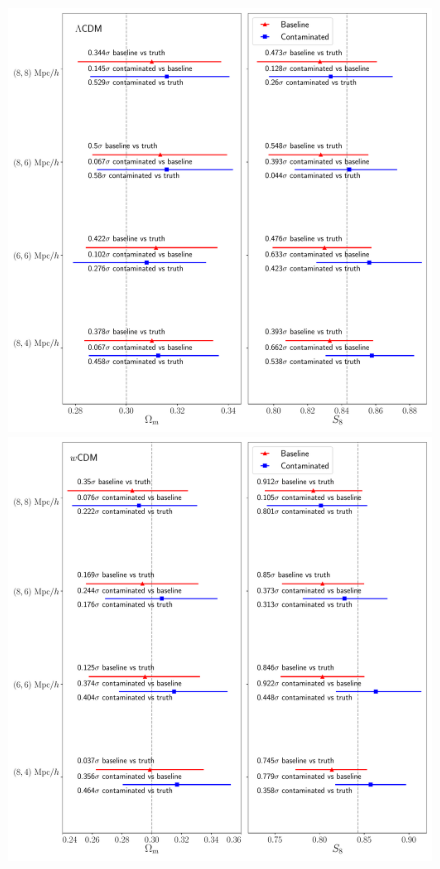\documentclass[fleqn,usenatbib]{mnras}
\begin{document}
\begin{figure}
\includegraphics[width=\columnwidth]{figs/2x2pt_1dmarg_lcdm_paper.pdf}
\includegraphics[width=\columnwidth]{figs/2x2pt_1dmarg_wcdm_paper.pdf}

\end{figure}
\end{document}
